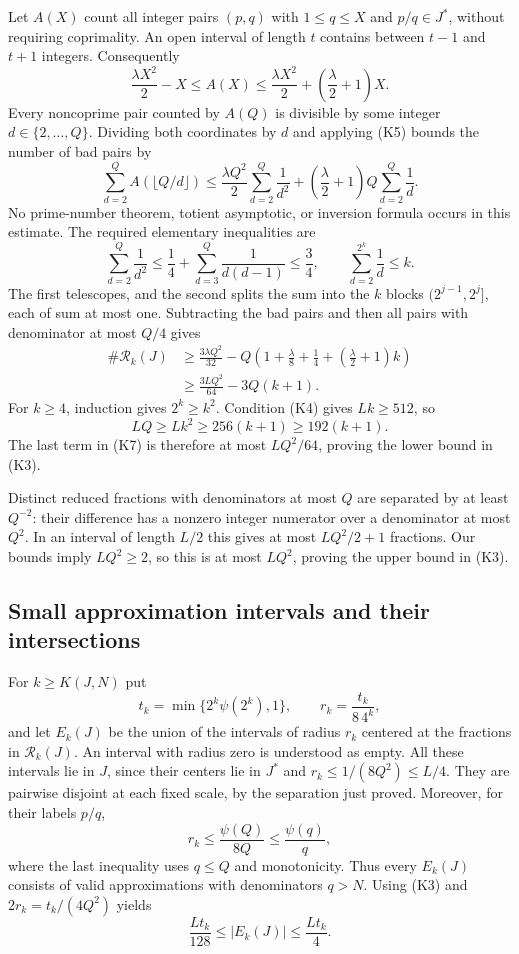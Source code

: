 Let $A(X)$ count all integer pairs $(p,q)$ with $1\leq q\leq X$ and
$p/q\in J^*$, without requiring coprimality.  An open interval of length
$t$ contains between $t-1$ and $t+1$ integers.  Consequently
\[
 \frac{\lambda X^2}{2}-X\leq A(X)
 \leq\frac{\lambda X^2}{2}+\left(\frac\lambda2+1\right)X.
 \tag{K5}
\]
Every noncoprime pair counted by $A(Q)$ is divisible by some integer
$d\in\{2,\ldots,Q\}$.  Dividing both coordinates by $d$ and applying
(K5) bounds the number of bad pairs by
\[
 \sum_{d=2}^Q A(\lfloor Q/d\rfloor)
 \leq\frac{\lambda Q^2}{2}\sum_{d=2}^Q\frac1{d^2}
      +\left(\frac\lambda2+1\right)Q\sum_{d=2}^Q\frac1d.
\]
No prime-number theorem, totient asymptotic, or inversion formula occurs
in this estimate.  The required elementary inequalities are
\[
 \sum_{d=2}^Q\frac1{d^2}\leq\frac14+
       \sum_{d=3}^Q\frac1{d(d-1)}\leq\frac34,
 \qquad
 \sum_{d=2}^{2^k}\frac1d\leq k.
 \tag{K6}
\]
The first telescopes, and the second splits the sum into the $k$ blocks
$(2^{j-1},2^j]$, each of sum at most one.  Subtracting the bad pairs and
then all pairs with denominator at most $Q/4$ gives
\begin{align*}
 \#\mathcal R_k(J)
 &\geq \frac{3\lambda Q^2}{32}
 -Q\left(1+\frac\lambda8+\frac14+
                 \left(\frac\lambda2+1\right)k\right)\\
 &\geq\frac{3LQ^2}{64}-3Q(k+1).
 \tag{K7}
\end{align*}
For $k\geq4$, induction gives $2^k\geq k^2$.  Condition (K4) gives
$Lk\geq512$, so
\[
 LQ\geq Lk^2\geq256(k+1)\geq192(k+1).
\]
The last term in (K7) is therefore at most $LQ^2/64$, proving the lower
bound in (K3).

Distinct reduced fractions with denominators at most $Q$ are separated
by at least $Q^{-2}$: their difference has a nonzero integer numerator
over a denominator at most $Q^2$.  In an interval of length $L/2$ this
gives at most $LQ^2/2+1$ fractions.  Our bounds imply $LQ^2\geq2$, so
this is at most $LQ^2$, proving the upper bound in (K3).

\subsection{Small approximation intervals and their intersections}

For $k\geq K(J,N)$ put
\[
 t_k=\min\{2^k\psi(2^k),1\},\qquad
 r_k=\frac{t_k}{8\,4^k},
\]
and let $E_k(J)$ be the union of the intervals of radius $r_k$ centered
at the fractions in $\mathcal R_k(J)$.  An interval with radius zero is
understood as empty.  All these intervals lie in $J$, since their centers
lie in $J^*$ and $r_k\leq1/(8Q^2)\leq L/4$.  They are pairwise disjoint
at each fixed scale, by the separation just proved.  Moreover, for their
labels $p/q$,
\[
 r_k\leq\frac{\psi(Q)}{8Q}\leq\frac{\psi(q)}q,
\]
where the last inequality uses $q\leq Q$ and monotonicity.  Thus every
$E_k(J)$ consists of valid approximations with denominators $q>N$.
Using (K3) and $2r_k=t_k/(4Q^2)$ yields
\[
 \frac{Lt_k}{128}\leq |E_k(J)|\leq\frac{Lt_k}{4}.
 \tag{K8}
\]


